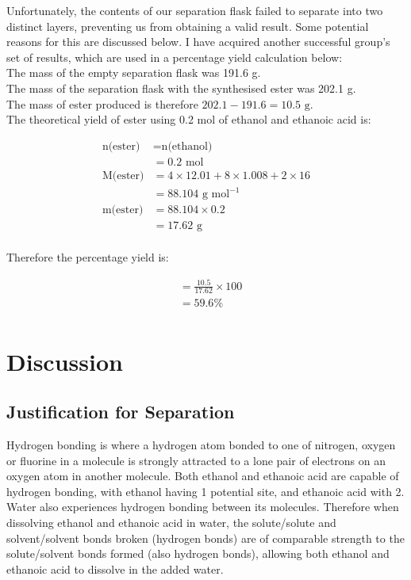 \documentclass[a4paper,11pt]{article}
\begin{document}
Unfortunately, the contents of our separation flask failed to separate into two
distinct layers, preventing us from obtaining a valid result. Some potential
reasons for this are discussed below. I have acquired another successful group's
set of results, which are used in a percentage yield calculation below: \\

The mass of the empty separation flask was 191.6 g. \\

The mass of the separation flask with the synthesised ester was 202.1 g. \\

The mass of ester produced is therefore $202.1 - 191.6 = 10.5\mbox{ g}$. \\

The theoretical yield of ester using 0.2 mol of ethanol and ethanoic acid is:

$$
\begin{aligned}
	\mbox{n(ester)} & = \mbox{n(ethanol)} \\
					& = 0.2\mbox{ mol} \\
	\mbox{M(ester)} & = 4 \times 12.01 + 8 \times 1.008 + 2 \times 16 \\
			& = 88.104\mbox{ g mol}^{-1} \\
	\mbox{m(ester)} & = 88.104 \times 0.2 \\
			& = 17.62\mbox{ g} \\
\end{aligned}
$$

Therefore the percentage yield is:

$$
\begin{aligned}
	& = \frac{10.5}{17.62} \times 100 \\
	& = 59.6 \% \\
\end{aligned}
$$


\section{Discussion}

\subsection{Justification for Separation}

Hydrogen bonding is where a hydrogen atom bonded to one of nitrogen, oxygen or
fluorine in a molecule is strongly attracted to a lone pair of electrons on an
oxygen atom in another molecule. Both ethanol and ethanoic acid are capable of
hydrogen bonding, with ethanol
having 1 potential site, and ethanoic acid with 2. Water also experiences
hydrogen bonding between its molecules. Therefore when dissolving ethanol and
ethanoic acid in water, the solute/solute and solvent/solvent bonds broken
(hydrogen bonds) are
of comparable strength to the solute/solvent bonds formed (also hydrogen
bonds), allowing both ethanol and ethanoic acid to dissolve in the added
water. \\
\end{document}
